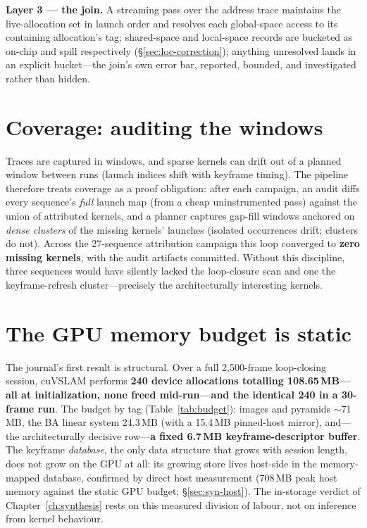\textbf{Layer 3 --- the join.} A streaming pass over the address trace
maintains the live-allocation set in launch order and resolves each
global-space access to its containing allocation's tag; shared-space and
local-space records are bucketed as on-chip and spill respectively
(\S\ref{sec:loc-correction}); anything unresolved lands in an explicit
 bucket---the join's own error bar, reported, bounded, and
investigated rather than hidden.

\section{Coverage: auditing the windows}
\label{sec:attr-coverage}

Traces are captured in windows, and sparse kernels can drift out of a
planned window between runs (launch indices shift with keyframe timing). The
pipeline therefore treats coverage as a proof obligation: after each
campaign, an audit diffs every sequence's \emph{full} launch map (from a
cheap uninstrumented pass) against the union of attributed kernels, and a
planner captures gap-fill windows anchored on \emph{dense clusters} of the
missing kernels' launches (isolated occurrences drift; clusters do not).
Across the 27-sequence attribution campaign this loop converged to
\textbf{zero missing kernels}, with the audit artifacts committed. Without
this discipline, three sequences would have silently lacked the loop-closure
scan and one the keyframe-refresh cluster---precisely the
architecturally interesting kernels.

\section{The GPU memory budget is static}
\label{sec:attr-static}

The journal's first result is structural. Over a full 2{,}500-frame
loop-closing session, cuVSLAM performs \textbf{240 device allocations
totalling 108.65\,MB---all at initialization, none freed mid-run---and the
identical 240 in a 30-frame run}. The budget by tag
(Table~\ref{tab:budget}): images and pyramids $\sim$71\,MB, the BA linear
system 24.3\,MB (with a 15.4\,MB pinned-host mirror), and---the
architecturally decisive row---\textbf{a fixed 6.7\,MB keyframe-descriptor
buffer}. The keyframe \emph{database}, the only data structure that grows
with session length, does not grow on the GPU at all: its growing store
lives host-side in the memory-mapped database, confirmed by direct host
measurement (708\,MB peak host memory against the static GPU budget;
\S\ref{sec:syn-host}). The in-storage verdict of
Chapter~\ref{ch:synthesis} rests on this measured division of labour, not
on inference from kernel behaviour.

